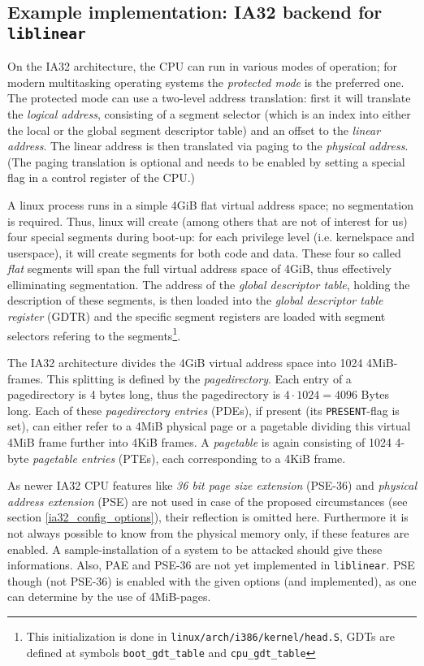 \subsection{Example implementation: IA32 backend for \texttt{liblinear}}

On the IA32 architecture, the CPU can run in various modes of operation; for
modern multitasking operating systems the \emph{protected mode} is the preferred
one.  The protected mode can use a two-level address translation: first it will
translate the \emph {logical address}, consisting of a segment selector (which
is an index into either the local or the global segment descriptor table) and an
offset to the \emph{linear address}.  The linear address is then translated via
paging to the \emph{physical address}. (The paging translation is optional and
needs to be enabled by setting a special flag in a control register of the CPU.)

\label{linux_gdt} A linux process runs in a simple 4GiB flat virtual address
space; no segmentation is required. Thus, linux will create (among others that
are not of interest for us) four special segments during boot-up: for each
privilege level (i.e. kernelspace and userspace), it will create segments for
both code and data. These four so called \emph{flat} segments will span the full
virtual address space of 4GiB, thus effectively elliminating segmentation. The
address of the \emph{global descriptor table}, holding the description of these
segments, is then loaded into the \emph{global descriptor table register} (GDTR)
and the specific segment registers are loaded with segment selectors refering to
the segments\footnote{This initialization is done in
\texttt{linux/arch/i386/kernel/head.S}, GDTs are defined at symbols
\texttt{boot\_gdt\_table} and \texttt{cpu\_gdt\_table}}.

The IA32 architecture divides the 4GiB virtual address space into 1024
4MiB-frames. This splitting is defined by the \emph{pagedirectory}. Each entry
of a pagedirectory is 4 bytes long, thus the pagedirectory is $4 \cdot 1024 =
4096$ Bytes long. Each of these \emph{pagedirectory entries} (PDEs), if present
(its \texttt{PRESENT}-flag is set), can either refer to a 4MiB physical page or
a pagetable dividing this virtual 4MiB frame further into 4KiB frames. A
\emph{pagetable} is again consisting of 1024 4-byte \emph{pagetable entries}
(PTEs), each corresponding to a 4KiB frame.

As newer IA32 CPU features like \emph{36 bit page size extension} (PSE-36) and
\emph{physical address extension} (PSE) are not used in case of the proposed
circumstances (see section \ref{ia32_config_options}), their reflection is
omitted here.  Furthermore it is not always possible to know from the physical
memory only, if these features are enabled.  A sample-installation of a system
to be attacked should give these informations. Also, PAE and PSE-36 are not yet
implemented in \texttt{liblinear}. PSE though (not PSE-36) is enabled with the
given options (and implemented), as one can determine by the use of 4MiB-pages.

